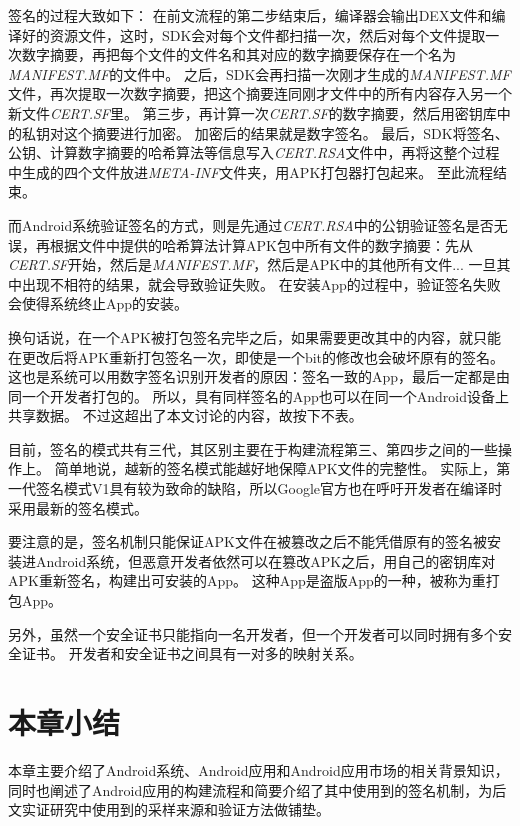 签名的过程大致如下：
在前文流程的第二步结束后，编译器会输出DEX文件和编译好的资源文件，这时，SDK会对每个文件都扫描一次，然后对每个文件提取一次数字摘要，再把每个文件的文件名和其对应的数字摘要保存在一个名为\textit{MANIFEST.MF}的文件中。
之后，SDK会再扫描一次刚才生成的\textit{MANIFEST.MF}文件，再次提取一次数字摘要，把这个摘要连同刚才文件中的所有内容存入另一个新文件\textit{CERT.SF}里。
第三步，再计算一次\textit{CERT.SF}的数字摘要，然后用密钥库中的私钥对这个摘要进行加密。
加密后的结果就是数字签名。
最后，SDK将签名、公钥、计算数字摘要的哈希算法等信息写入\textit{CERT.RSA}文件中，再将这整个过程中生成的四个文件放进\textit{META-INF}文件夹，用APK打包器打包起来。
至此流程结束。

而Android系统验证签名的方式，则是先通过\textit{CERT.RSA}中的公钥验证签名是否无误，再根据文件中提供的哈希算法计算APK包中所有文件的数字摘要：先从\textit{CERT.SF}开始，然后是\textit{MANIFEST.MF}，然后是APK中的其他所有文件...
一旦其中出现不相符的结果，就会导致验证失败。
在安装App的过程中，验证签名失败会使得系统终止App的安装。

换句话说，在一个APK被打包签名完毕之后，如果需要更改其中的内容，就只能在更改后将APK重新打包签名一次，即使是一个bit的修改也会破坏原有的签名。
这也是系统可以用数字签名识别开发者的原因：签名一致的App，最后一定都是由同一个开发者打包的。
所以，具有同样签名的App也可以在同一个Android设备上共享数据。
不过这超出了本文讨论的内容，故按下不表。

目前，签名的模式共有三代，其区别主要在于构建流程第三、第四步之间的一些操作上。
简单地说，越新的签名模式能越好地保障APK文件的完整性。
实际上，第一代签名模式V1具有较为致命的缺陷，所以Google官方也在呼吁开发者在编译时采用最新的签名模式。

要注意的是，签名机制只能保证APK文件在被篡改之后不能凭借原有的签名被安装进Android系统，但恶意开发者依然可以在篡改APK之后，用自己的密钥库对APK重新签名，构建出可安装的App。
这种App是盗版App的一种，被称为重打包App。

另外，虽然一个安全证书只能指向一名开发者，但一个开发者可以同时拥有多个安全证书。
开发者和安全证书之间具有一对多的映射关系。

\section{本章小结}

本章主要介绍了Android系统、Android应用和Android应用市场的相关背景知识，同时也阐述了Android应用的构建流程和简要介绍了其中使用到的签名机制，为后文实证研究中使用到的采样来源和验证方法做铺垫。

